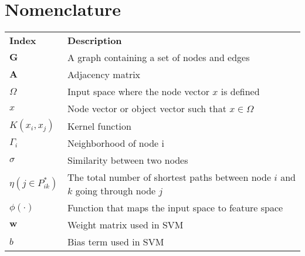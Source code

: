 \chapter*{Nomenclature}

{\centering
\begin{longtabu}{X[2cm,l] X[8cm,p,l]}


\\
\textbf{Index} & \textbf{Description}\\
$\textbf{G}$ & A graph containing a set of nodes and edges\\
$\textbf{A}$ & Adjacency matrix\\
$\Omega$ & Input space where the node vector $x$ is defined\\
$x$ & Node vector or object vector such that $x \in \Omega$\\
$K(x_i,x_j)$ & Kernel function\\
$\Gamma_i$ & Neighborhood of node i\\
$\sigma$ & Similarity between two nodes\\
$\eta(j\in P_{ik}^*)$ & The total number of shortest paths between node $i$ and $k$ going through node $j$\\
$\phi(\cdot)$ & Function that maps the input space to feature space\\
$\bm{w}$ & Weight matrix used in SVM\\
$b$ & Bias term used in SVM\\


\end{longtabu}}

